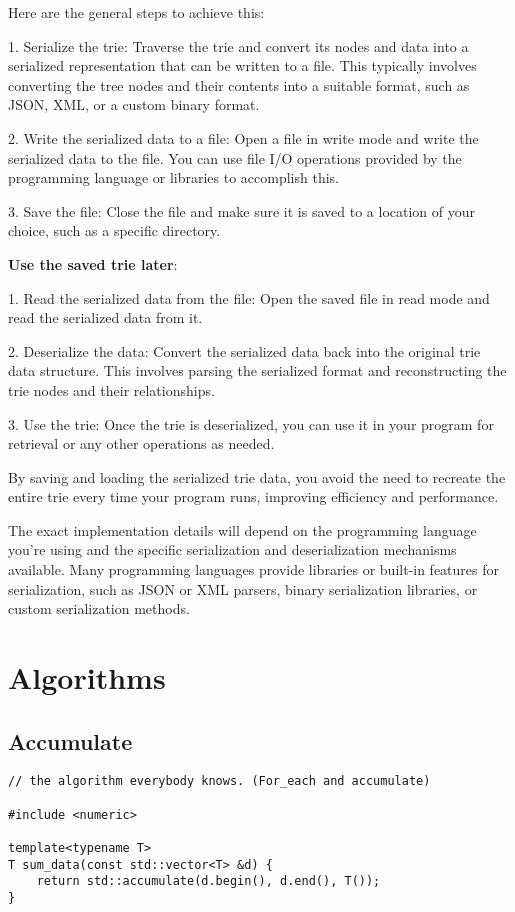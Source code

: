 \documentclass[openany]{report}
\begin{document}
Here are the general steps to achieve this:

1. Serialize the trie: Traverse the trie and convert its nodes and data
into a serialized representation that can be written to a file.
This typically involves converting the tree nodes and their contents into
a suitable format, such as JSON, XML, or a custom binary format.

2. Write the serialized data to a file: Open a file in write mode and write the serialized data to the file.
You can use file I/O operations provided by the programming language or libraries to accomplish this.

3. Save the file: Close the file and make sure it is saved to a location of your choice,
such as a specific directory.

\textbf{Use the saved trie later}:

1. Read the serialized data from the file:
Open the saved file in read mode and read the serialized data from it.

2. Deserialize the data: Convert the serialized data back into the original trie data structure.
This involves parsing the serialized format and reconstructing the trie nodes and their relationships.

3. Use the trie: Once the trie is deserialized,
you can use it in your program for retrieval or any other operations as needed.

By saving and loading the serialized trie data,
you avoid the need to recreate the entire trie every time your program runs,
improving efficiency and performance.

The exact implementation details will depend on the programming language 
you're using and the specific serialization and deserialization mechanisms available.
Many programming languages provide libraries or built-in features for serialization,
such as JSON or XML parsers, binary serialization libraries, or custom serialization methods.

\section{Algorithms}

\subsection{Accumulate}

\begin{verbatim}
// the algorithm everybody knows. (For_each and accumulate)

#include <numeric>

template<typename T>
T sum_data(const std::vector<T> &d) {
    return std::accumulate(d.begin(), d.end(), T());
}
\end{verbatim}
\end{document}
